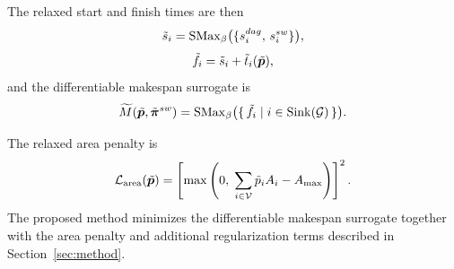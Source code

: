 The relaxed start and finish times are then
\begin{equation}
\tilde{s}_i=\mathrm{SMax}_{\beta}\big(\{s_i^{dag},\,s_i^{sw}\}\big),
\label{eq:soft_start}
\end{equation}
\begin{equation}
\tilde{f}_i=\tilde{s}_i+\tilde{t}_i(\tilde{\bm{p}}),
\label{eq:soft_finish}
\end{equation}
and the differentiable makespan surrogate is
\begin{equation}
\widetilde{M}(\tilde{\bm{p}},\tilde{\bm{\pi}}^{sw})
=
\mathrm{SMax}_{\beta}\big(\{\, \tilde{f}_i \mid i \in \mathrm{Sink}(\mathcal{G})\,\}\big).
\label{eq:soft_makespan_symbol}
\end{equation}

The relaxed area penalty is
\begin{equation}
\mathcal{L}_{\mathrm{area}}(\tilde{\bm{p}})
=
\left[
\max\left(
0,\;
\sum_{i\in\mathcal{V}}\tilde{p}_i A_i - A_{\max}
\right)
\right]^2.
\label{eq:l_area}
\end{equation}
The proposed method minimizes the differentiable makespan surrogate together with the area penalty and additional regularization terms described in Section~\ref{sec:method}.
